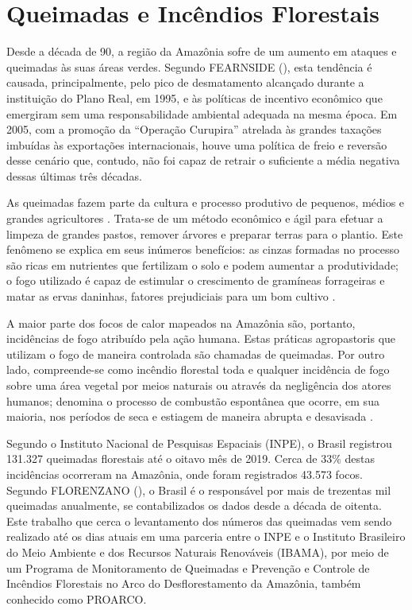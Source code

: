 \section{Queimadas e Incêndios Florestais}

Desde a década de 90, a região da Amazônia sofre de um  aumento em ataques e queimadas às suas áreas verdes. Segundo FEARNSIDE (\citeyear{fearnside06}), esta tendência é causada, principalmente, pelo pico de desmatamento alcançado durante a instituição do Plano Real, em 1995, e às políticas de incentivo econômico que emergiram sem uma responsabilidade ambiental adequada na mesma época. Em 2005, com a promoção da ``Operação Curupira'' atrelada às grandes taxações imbuídas às exportações internacionais, houve uma política de freio e reversão desse cenário que, contudo, não foi capaz de retrair o suficiente a média negativa dessas últimas três décadas.

As queimadas fazem parte da cultura e processo produtivo de pequenos, médios e grandes agricultores \cite{leonel00}. Trata-se de um método econômico e ágil para efetuar a limpeza de grandes pastos, remover árvores e preparar terras para o plantio. Este fenômeno se explica em seus inúmeros benefícios: as cinzas formadas no processo são ricas em nutrientes que fertilizam o solo e podem aumentar a produtividade; o fogo utilizado é capaz de estimular o crescimento de gramíneas forrageiras e matar as ervas daninhas, fatores prejudiciais para um bom cultivo \cite{sodre21}.

A maior parte dos focos de calor mapeados na Amazônia são, portanto, incidências de fogo atribuído pela ação humana. Estas práticas agropastoris que utilizam o fogo de maneira controlada são chamadas de queimadas. Por outro lado, compreende-se como incêndio florestal toda e qualquer incidência de fogo sobre uma área vegetal por meios naturais ou através da negligência dos atores humanos; denomina o processo de combustão espontânea que ocorre, em sua maioria, nos períodos de seca e estiagem de maneira abrupta e desavisada \cite{vigano17,leonel00}.

Segundo o Instituto Nacional de Pesquisas Espaciais (INPE), o Brasil registrou 131.327 queimadas florestais até o oitavo mês de 2019. Cerca de 33\% destas incidências ocorreram na Amazônia, onde foram registrados 43.573 focos. Segundo FLORENZANO (\citeyear{florenzano07}), o Brasil é o responsável por mais de trezentas mil queimadas anualmente, se contabilizados os dados desde a década de oitenta. Este trabalho que cerca o levantamento dos números das queimadas vem sendo realizado até os dias atuais em uma parceria entre o INPE e o Instituto Brasileiro do Meio Ambiente e dos Recursos Naturais Renováveis (IBAMA), por meio de um Programa de Monitoramento de Queimadas e Prevenção e Controle de Incêndios Florestais no Arco do Desflorestamento da Amazônia, também conhecido como PROARCO.


